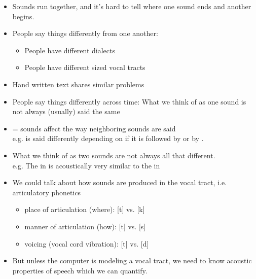 \documentclass[a4paper,landscape,headrule,footrule,xetex]{foils}
\begin{document}
\begin{itemize}
\item Sounds run together, and it's hard to tell where one sound ends and another begins.
\item People say things differently from one another: 
  \begin{itemize}
  \item People have different dialects
  \item People have different sized vocal tracts 
  \end{itemize}
\item Hand written text shares similar problems
\newpage
\item People say things differently across time: What we think of as one sound is not always (usually) said the same
\item {} = sounds affect the way neighboring sounds are said
\\e.g.  is said differently depending on if it is followed by  or by .

\item What we think of as two sounds are not always all that different.
\\ e.g. The  in  is acoustically very similar to the  in 
\end{itemize}






\begin{itemize}
\item We could talk about how sounds are produced in the vocal tract, i.e. articulatory phonetics
\begin{itemize}
\item place of articulation (where): [t] vs. [k]
\item manner of articulation (how): [t] vs. [s]
\item voicing (vocal cord vibration): [t] vs. [d]
\end{itemize}
\item But unless the computer is modeling a vocal tract, we need to know acoustic properties of speech which we can quantify.
\end{itemize}





\end{document}
